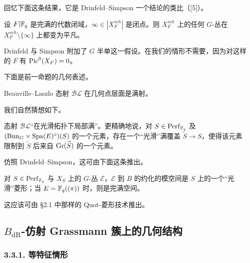 回忆下面这条结果，它是 Drinfeld–Simpson 一个结论的类比（[5]）。

\begin{proposition}[{[6]}]\label{prop:3.5}
设 $F|\mathbb{F}_q$ 是完满的代数闭域，$\infty\in|X_F^{sch}|$ 是闭点。则 $X_F^{sch}$ 上的任何 $G$-丛在 $X_F^{sch}\setminus\{\infty\}$ 上都变为平凡。
\end{proposition}

\begin{remark}\label{rem:3.6}
Drinfeld 与 Simpson 附加了 $G$ 半单这一假设。在我们的情形不需要，因为对这样的 $F$ 有 $\operatorname{Pic}^0(X_F)=0$。
\end{remark}

下面是前一命题的几何表述。

\begin{proposition}\label{prop:3.7}
Beauville–Laszlo 态射 $\mathcal{BL}$ 在几何点层面是满射。
\end{proposition}

我们自然猜想如下。

\begin{conjecture}\label{conj:3.8}
态射 $\mathcal{BL}$“在光滑拓扑下局部满”。更精确地说，对 $S\in\mathrm{Perf}_{\mathbb{F}_q}$ 及 $(\mathrm{Bun}_G\times\mathrm{Spa}(E)^{\diamond})(S)$ 的一个元素，存在一个“光滑”满覆盖 $\widetilde{S}\to S$，使得该元素限制到 $\widetilde{S}$ 后来自 $\mathrm{Gr}(\widetilde{S})$ 的一个元素。
\end{conjecture}

仿照 Drinfeld–Simpson，这可由下面这条推出。

\begin{conjecture}\label{conj:3.9}
对 $S\in\mathrm{Perf}_{\mathbb{F}_q}$ 与 $X_S$ 上的 $G$-丛 $\mathcal{E}$，$\mathcal{E}$ 到 $B$ 的约化的模空间是 $S$ 上的一个“光滑”菱形；当 $E=\mathbb{F}_q((\pi))$ 时，则是完满空间。
\end{conjecture}

这应该可由 §2.1 中那样的 Quot-菱形技术推出。

\subsection{\texorpdfstring{$B_{\mathrm{dR}}$}{BdR}-仿射 Grassmann 簇上的几何结构}%

\subsubsection*{3.3.1. 等特征情形}%

